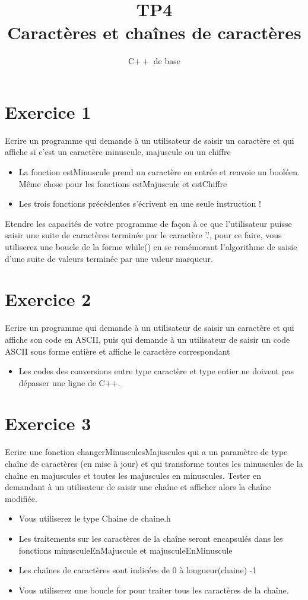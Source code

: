 \documentclass{article}
\title{TP4\\ Caractères et chaînes de caractères}
\date{C$++$ de base}
\begin{document}
	\maketitle 
	\section*{Exercice 1}
		Ecrire un programme qui demande à un utilisateur de saisir un caractère et qui affiche si c'est un caractère minuscule, majuscule ou un chiffre
		\begin{itemize}
			\item La fonction estMinuscule prend un caractère en entrée et renvoie un booléen. Même chose pour les fonctions estMajuscule et estChiffre
			\item Les trois fonctions précédentes s'écrivent en une seule instruction !
		\end{itemize}
		Etendre les capacités de votre programme de façon à ce que l'utilisateur puisse saisir une suite de caractères terminée par le caractère '.', pour ce faire, vous utiliserez une boucle de la forme while() {} en se remémorant l'algorithme de saisie d'une suite de valeurs terminée par une valeur marqueur.
	\section*{Exercice 2}
		Ecrire un programme qui demande à un utilisateur de saisir un caractère et qui affiche son code en ASCII, puis qui demande à un utilisateur de saisir un code ASCII sous forme entière et affiche le caractère correspondant
		\begin{itemize}
			\item Les codes des conversions entre type caractère et type entier ne doivent pas dépasser une ligne de C++.
		\end{itemize}		
	\section*{Exercice 3}
		Ecrire une fonction changerMinusculesMajuscules qui a un paramètre de type chaîne de caractères (en mise à jour) et qui transforme toutes les minuscules de la chaîne en majuscules et toutes les majuscules en minuscules. Tester en demandant à un utilisateur de saisir une chaîne et afficher alors la chaîne modifiée.
		\begin{itemize}
			\item Vous utiliserez le type Chaine de chaine.h
			\item Les traitements sur les caractères de la chaîne seront encapsulés dans les fonctions minusculeEnMajuscule et majusculeEnMinuscule
			\item Les chaînes de caractères sont indicées de 0 à longueur(chaine) -1			
			\item Vous utiliserez une boucle for pour traiter tous les caractères de la chaîne.			
		\end{itemize}		
\end{document}
